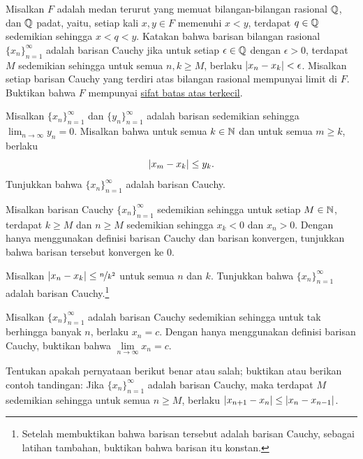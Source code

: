 \begin{exercise}[Menantang]
Misalkan $F$ adalah medan terurut yang memuat bilangan-bilangan rasional
${\mathbb{Q}}$, dan ${\mathbb{Q}}$ padat,
yaitu, setiap kali $x,y \in F$ memenuhi $x < y$,
terdapat $q \in {\mathbb{Q}}$ sedemikian sehingga $x < q < y$.
Katakan bahwa barisan bilangan rasional $\{ x_n \}_{n=1}^\infty$ adalah barisan Cauchy
jika untuk setiap $\epsilon \in {\mathbb{Q}}$ dengan $\epsilon > 0$, terdapat
$M$ sedemikian sehingga untuk semua $n,k \geq M$, berlaku $\lvert {x_n-x_k} \rvert < \epsilon$.
Misalkan setiap barisan Cauchy yang terdiri atas bilangan rasional mempunyai limit di $F$.
Buktikan bahwa $F$ mempunyai \hyperref[defn:lub]{sifat batas atas terkecil}.
\end{exercise}

\begin{exercise}
Misalkan $\{ x_n \}_{n=1}^\infty$ dan $\{ y_n \}_{n=1}^\infty$ adalah barisan sedemikian
sehingga $\lim_{n\to\infty} y_n =0$.  Misalkan bahwa untuk semua $k \in {\mathbb{N}}$
dan
untuk semua $m \geq k$, berlaku
\begin{equation*}
\lvert {x_m-x_k} \rvert \leq y_k .
\end{equation*}
Tunjukkan bahwa $\{ x_n \}_{n=1}^\infty$ adalah barisan Cauchy.
\end{exercise}

\begin{exercise}
Misalkan barisan Cauchy $\{ x_n \}_{n=1}^\infty$ sedemikian sehingga untuk setiap $M \in {\mathbb{N}}$,
terdapat $k \geq M$ dan $n \geq M$ sedemikian sehingga
$x_k < 0$ dan $x_n > 0$.  Dengan hanya menggunakan definisi barisan Cauchy
dan barisan konvergen, tunjukkan bahwa
barisan tersebut konvergen ke $0$.
\end{exercise}

\begin{exercise}
Misalkan $\lvert {x_n-x_k} \rvert \leq \nicefrac{n}{k^2}$ untuk semua $n$ dan $k$.
Tunjukkan bahwa $\{ x_n \}_{n=1}^\infty$ adalah barisan Cauchy.\footnote{Setelah membuktikan bahwa
barisan tersebut adalah barisan Cauchy, sebagai latihan tambahan, buktikan bahwa barisan itu konstan.}
\end{exercise}

\begin{exercise}
Misalkan $\{ x_n \}_{n=1}^\infty$ adalah barisan Cauchy sedemikian sehingga untuk tak berhingga banyak
$n$, berlaku $x_n = c$.  Dengan hanya menggunakan definisi barisan Cauchy, buktikan 
bahwa $\lim\limits_{n\to\infty} x_n = c$.
\end{exercise}

\begin{exercise}
Tentukan apakah pernyataan berikut benar atau salah; buktikan atau berikan contoh tandingan: Jika $\{ x_n \}_{n=1}^\infty$ adalah barisan
Cauchy, maka terdapat $M$
sedemikian sehingga untuk semua $n \geq M$, berlaku
$\lvert {x_{n+1}-x_n} \rvert
\leq
\lvert {x_{n}-x_{n-1}} \rvert$.
\end{exercise}

